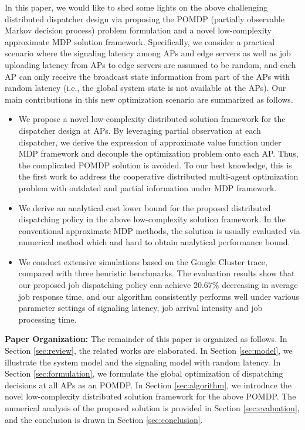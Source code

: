 In this paper, we would like to shed some lights on the above challenging distributed dispatcher design via proposing the POMDP (partially observable Markov decision process) problem formulation and a novel low-complexity approximate MDP solution framework.
Specifically, we consider a practical scenario where the signaling latency among APs and edge servers as well as job uploading latency from APs to edge servers are assumed to be random, and each AP can only receive the broadcast state information from part of the APs with random latency (i.e., the global system state is not available at the APs).
Our main contributions in this new optimization scenario are summarized as follows.
\begin{itemize}
    \item %
    We propose a novel low-complexity distributed solution framework for the dispatcher design at APs.
    By leveraging partial observation at each dispatcher, we derive the expression of approximate value function under MDP framework and decouple the optimization problem onto each AP.
    Thus, the complicated POMDP solution is avoided.
    To our best knowledge, this is the first work to address the cooperative distributed multi-agent optimization problem with outdated and partial information under MDP framework.
    \item %
    We derive an analytical cost lower bound for the proposed distributed dispatching policy in the above low-complexity solution framework.
    In the conventional approximate MDP methods, the solution is usually evaluated via numerical method which and hard to obtain analytical performance bound.
    \item We conduct extensive simulations based on the Google Cluster trace, compared with three heuristic benchmarks. The evaluation results show that our proposed job dispatching policy can achieve $20.67\%$ decreasing in average job response time, and our algorithm consistently performs well under various parameter settings of signaling latency, job arrival intensity and job processing time.
\end{itemize}

\noindent \textbf{Paper Organization: }The remainder of this paper is organized as follows.
In Section \ref{sec:review}, the related works are elaborated.
In Section \ref{sec:model}, we illustrate the system model and the signaling model with random latency.
In Section \ref{sec:formulation}, we formulate the global optimization of dispatching decisions at all APs as an POMDP.
In Section \ref{sec:algorithm}, we introduce the novel low-complexity distributed solution framework for the above POMDP.
The numerical analysis of the proposed solution is provided in Section \ref{sec:evaluation}, and the conclusion is drawn in Section \ref{sec:conclusion}.

